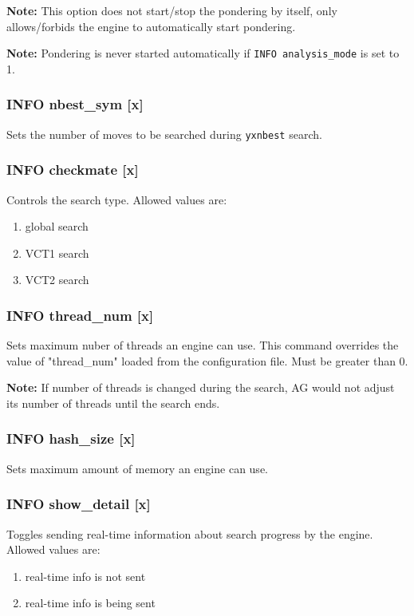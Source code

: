 \documentclass[12pt,a4paper]{article}
\begin{document}
\textbf{Note:} This option does not start/stop the pondering by itself, only allows/forbids the engine to automatically start pondering.

\textbf{Note:} Pondering is never started automatically if \texttt{INFO analysis{\_}mode} is set to 1.

\subsubsection{INFO nbest{\_}sym [x]}
Sets the number of moves to be searched during \texttt{yxnbest} search.

\subsubsection{INFO checkmate [x]}
Controls the search type. Allowed values are:
\begin{enumerate}[leftmargin=7.5em]
	\item[\text{$[x]=0$}]{global search}
	\item[\text{$[x]=1$}]{VCT1 search}
	\item[\text{$[x]=2$}]{VCT2 search}
\end{enumerate}

\subsubsection{INFO thread{\_}num [x]}
Sets maximum nuber of threads an engine can use. This command overrides the value of "thread{\_}num" loaded from the configuration file. Must be greater than 0. 

\textbf{Note:} If number of threads is changed during the search, AG would not adjust its number of threads until the search ends.

\subsubsection{INFO hash{\_}size [x]}
Sets maximum amount of memory an engine can use.

\subsubsection{INFO show{\_}detail [x]}
Toggles sending real-time information about search progress by the engine. Allowed values are:
\begin{enumerate}[leftmargin=7.5em]
	\item[\text{$[x]=0$}]{real-time info is not sent}
	\item[\text{$[x]=1$}]{real-time info is being sent}
\end{enumerate}
\end{document}
